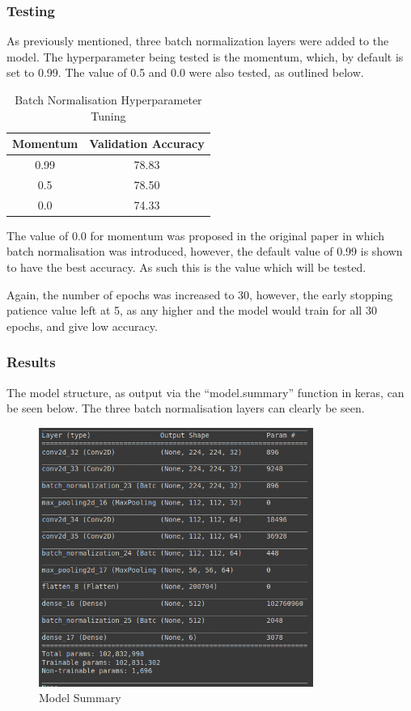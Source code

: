 \subsubsection{Testing}

As previously mentioned, three batch normalization layers were added to the
model. The hyperparameter being tested is the momentum, which, by default is set
to 0.99. The value of 0.5 and 0.0 were also tested, as outlined below.

\begin{table}[H]
	\centering
	\caption{Batch Normalisation Hyperparameter Tuning}
	\label{tab:bnhyp}
	\begin{tabular}{|c|c|}
	\hline
	Momentum & Validation Accuracy \\
	\hline
	0.99 & 78.83 \\
	0.5  & 78.50 \\
	0.0  & 74.33 \\
	\hline
	\end{tabular}
\end{table}

The value of 0.0 for momentum was proposed in the original paper in which batch
normalisation was introduced, however, the default value of 0.99 is shown to
have the best accuracy. As such this is the value which will be tested.

Again, the number of epochs was increased to 30, however, the early stopping
patience value left at 5, as any higher and the model would train for all 30
epochs, and give low accuracy.

\subsubsection{Results}

The model structure, as output via the ``model.summary'' function in keras, can
be seen below. The three batch normalisation layers can clearly be seen.

\begin{figure}[H]
	\centering
	\includegraphics[width=0.8\textwidth]{images/q1/pd/q1pdmodel}
	\caption{Model Summary}
	\label{fig:q1pdmodel}
\end{figure}


